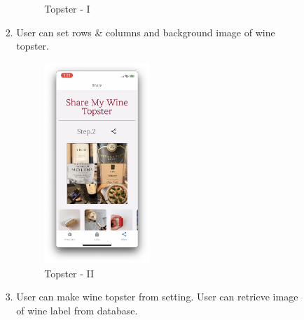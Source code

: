 \documentclass[conference]{IEEEtran}
\numberwithin{figure}{subsection}
\begin{document}
\begin{enumerate}
\begin{enumerate}
\begin{enumerate}
\begin{enumerate}
\begin{figure}[htb!]
                    \caption{Topster - I}
                \end{figure}
                \item User can set rows \& columns and background image of wine topster.
                \begin{figure}[htb!]
                    \centerline{\includegraphics[width=4cm]{top2.png}}
                    \caption{Topster - II}
                \end{figure}
                \item User can make wine topster from setting. User can retrieve image of wine label from database.
            \end{enumerate}
        \end{enumerate}
    

\end{enumerate}
\end{enumerate}
\end{document}
